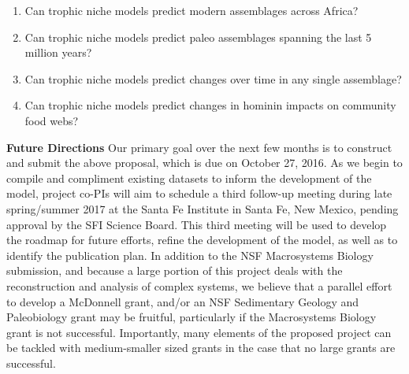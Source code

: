 \documentclass{article}[10pt]
\begin{document}
\begin{enumerate}
	\item Can trophic niche models predict modern assemblages across Africa?
	\item Can trophic niche models predict paleo assemblages spanning the last 5 million years?
	\item Can trophic niche models predict changes over time in any single assemblage?
	\item Can trophic niche models predict changes in hominin impacts on community food webs?
\end{enumerate}

\vspace{5 mm}

{\bf Future Directions} Our primary goal over the next few months is to construct and submit the above proposal, which is due on October 27, 2016.
As we begin to compile and compliment existing datasets to inform the development of the model, project co-PIs will aim to schedule a third follow-up meeting during late spring/summer 2017 at the Santa Fe Institute in Santa Fe, New Mexico, pending approval by the SFI Science Board.
This third meeting will be used to develop the roadmap for future efforts, refine the development of the model, as well as to identify the publication plan.
In addition to the NSF Macrosystems Biology submission, and because a large portion of this project deals with the reconstruction and analysis of complex systems, we believe that a parallel effort to develop a McDonnell grant, and/or an NSF Sedimentary Geology and Paleobiology grant may be fruitful, particularly if the Macrosystems Biology grant is not successful.
Importantly, many elements of the proposed project can be tackled with medium-smaller sized grants in the case that no large grants are successful.
\end{document}
